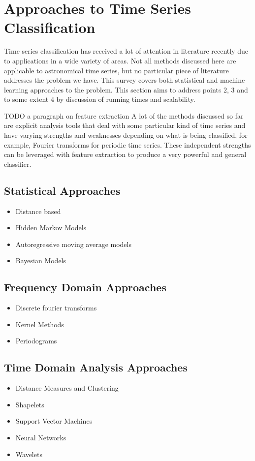 \documentclass[11pt]{article}
\begin{document}
	
	\section{Approaches to Time Series Classification}
	Time series classification has received a lot of attention in literature recently due to applications in a wide variety of areas. Not all methods discussed here are applicable to astronomical time series, but no particular piece of literature addresses the problem we have. This survey covers both statistical and machine learning approaches to the problem. This section aims to address points 2, 3 and to some extent 4 by discussion of running times and scalability.

	TODO a paragraph on feature extraction
	A lot of the methods discussed so far are explicit analysis tools that deal with some particular kind of time series and have varying strengths and weaknesses depending on what is being classified, for example, Fourier transforms for periodic time series. These independent strengths can be leveraged with feature extraction to produce a very powerful and general classifier. 
	\subsection{Statistical Approaches}
	\begin{itemize}
		\item Distance based
		\item Hidden Markov Models
		\item Autoregressive moving average models
		\item Bayesian Models
	\end{itemize}
	\subsection{Frequency Domain Approaches}
	\begin{itemize}
		\item Discrete fourier transforms
		\item Kernel Methods
		\item Periodograms
	\end{itemize}
	\subsection{Time Domain Analysis Approaches}
	\begin{itemize}
		\item Distance Measures and Clustering
		\item Shapelets
		\item Support Vector Machines
		\item Neural Networks
		\item Wavelets
	\end{itemize}
\end{document}
